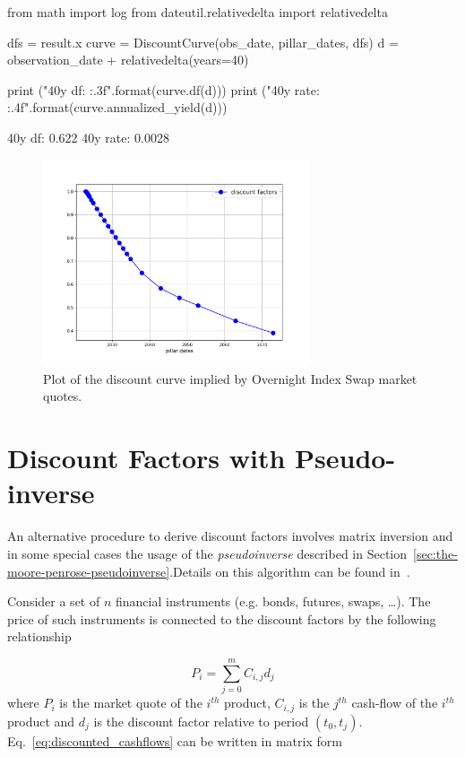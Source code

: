 \begin{ipython}
from math import log
from dateutil.relativedelta import relativedelta

dfs = result.x
curve = DiscountCurve(obs_date, pillar_dates, dfs)
d = observation_date + relativedelta(years=40)

print ("40y df: {:.3f}".format(curve.df(d)))
print ("40y rate: {:.4f}".format(curve.annualized_yield(d)))
\end{ipython}
\begin{ioutput}
40y df: 0.622
40y rate: 0.0028
\end{ioutput}

\begin{figure}[htb]
	\centering
	\includegraphics[width=0.7\textwidth]{figures/example_discount_curve}
	\caption{Plot of the discount curve implied by Overnight Index Swap market quotes.}
	\label{fig:discount_curve}
\end{figure}

\section{Discount Factors with Pseudo-inverse}
An alternative procedure to derive discount factors involves matrix inversion and in some special cases the usage of the \emph{pseudoinverse} described in Section~\ref{sec:the-moore-penrose-pseudoinverse}.Details on this algorithm can be found in~\cite{bib:boostrap_pseudoinv}.

Consider a set of $n$ financial instruments (e.g. bonds, futures, swaps, \ldots). The price of such instruments is connected to the discount factors by the following relationship

\begin{equation}
P_i = \sum_{j=0}^{m} C_{i,j} d_j
\label{eq:discounted_cashflows}
\end{equation}
where $P_i$ is the market quote of the $i^{th}$ product, $C_{i,j}$ is the $j^{th}$ cash-flow of the $i^{th}$ product and $d_j$ is the discount factor relative to period $(t_0, t_j)$.
Eq.~\ref{eq:discounted_cashflows} can be written in matrix form

